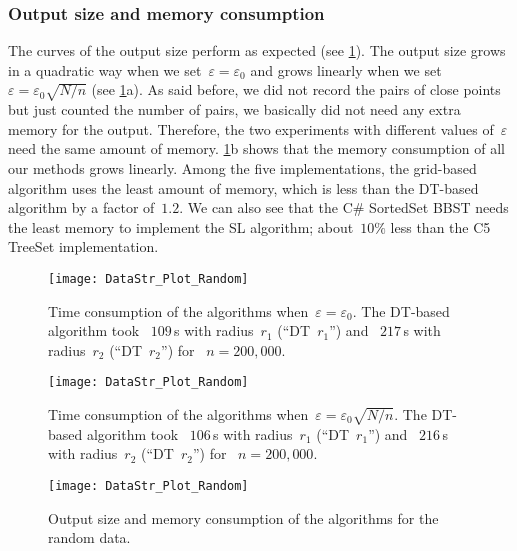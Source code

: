 \subsubsection{Output size and memory consumption}
The curves of the output size perform as expected
(see \fig\ref{fig:DataStr_RandomMemory}). 
The output size grows in a quadratic way
when we set~$\varepsilon =\varepsilon _{0}$ 
and grows linearly 
when we set~$\varepsilon =\varepsilon_{0}\sqrt{N/n}$
(see \fig\ref{fig:DataStr_RandomMemory}a). 
As said before, we did not record 
the pairs of close points 
but just counted the number of pairs, 
we basically did not need any extra memory for the output.
Therefore, the two experiments with different values 
of~$\varepsilon$ need the same amount of memory. 
\fig\ref{fig:DataStr_RandomMemory}b 
shows that the memory consumption of all our 
methods grows linearly. 
Among the five implementations, 
the grid-based algorithm uses 
the least amount of memory, 
which is less than the DT-based algorithm 
by a factor of~$1.2$. 
We can also see that the C\# SortedSet BBST needs 
the least memory to implement the SL algorithm; 
about~$10\%$ less than the C5 TreeSet implementation. 


\begin{figure}[tb]	
\centering
\texttt{[image: DataStr\_Plot\_Random]}
\vspace{-3mm}
\caption{Time consumption of the algorithms 
	when~$\varepsilon=\varepsilon_{0}$. 
	The DT-based algorithm took~
	$109\,$s with radius~$r_1$ (``DT~$r_1$'') and~  
	$217\,$s with radius~$r_2$ (``DT~$r_2$'') for~ 
    $n=200,000$.}
\label{fig:DataStr_RandomTimeEpsilonFix}
%
\vspace{8mm}
%
\centering
\texttt{[image: DataStr\_Plot\_Random]}
\vspace{-3mm}
\caption{Time consumption of the algorithms
	when~$\varepsilon=\varepsilon_{0} \sqrt{N/n}$. 
	The DT-based algorithm took~ 
	$106\,$s with radius~$r_1$ (``DT~$r_1$'') and~  
	$216\,$s with radius~$r_2$ (``DT~$r_2$'') for~ 
	$n=200{,}000$.}
\label{fig:DataStr_RandomTimeEpsilonDecrease}
%	
\vspace{8mm}
%
\centering
\texttt{[image: DataStr\_Plot\_Random]}
\vspace{-3mm}
\caption{Output size and memory consumption 
	of the 	algorithms for the random data.}
\label{fig:DataStr_RandomMemory}	
\end{figure}



